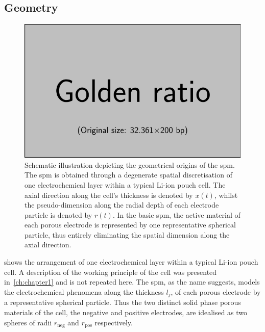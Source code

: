 
\subsection{Geometry}\label{subsec:basicspmgeometry}

\begin{figure}[h]
    \centering
    \includegraphics[width=\textwidth]{placeholder_images/example-image-golden.pdf}
    \caption[Schematic illustration depicting geometrical origins of the \gls{spm}]
    {Schematic illustration depicting the geometrical origins of the \gls{spm}. The \gls{spm} is obtained through a degenerate spatial discretisation of one electrochemical layer within a typical Li-ion pouch cell. The axial direction along the cell's thickness is denoted by $x(t)$, whilst the pseudo-dimension along the radial depth of each electrode particle is denoted by $r(t)$. In the basic \gls{spm}, the active material of each porous electrode is represented by one representative spherical particle, thus entirely eliminating the spatial dimension along the axial direction.}
    \label{fig:sandwichtospm}
\end{figure}


  shows the  arrangement  of  one electrochemical  layer
within a  typical Li-ion pouch cell.  A description of the  working principle of
the  cell was  presented in~\cref{ch:chapter1}  and  is not  repeated here.  The
\gls{spm}, as the name suggests,  models the electrochemical phenomena along the
thickness  $l_j$, \jinnegpos{}  of  each porous  electrode  by a  representative
spherical particle.  Thus the two distinct  solid phase porous materials  of the
cell, \ie{} the  negative and positive electrodes, are idealised  as two spheres
of radii $r_\text{neg}$ and $r_\text{pos}$ respectively.


